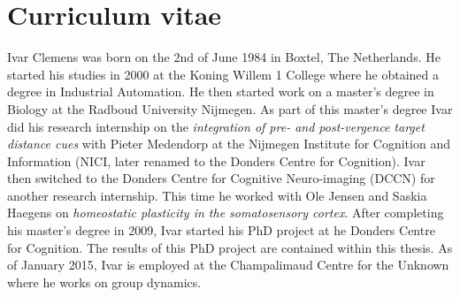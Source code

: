 \clearpage

\chapter*{Curriculum vitae}
{}

Ivar Clemens was born on the 2nd of June 1984 in Boxtel, The Netherlands. He started his studies in 2000 at the Koning Willem 1 College where he obtained a degree in Industrial Automation. He then started work on a master's degree in Biology at the Radboud University Nijmegen. As part of this master's degree Ivar did his research internship on the \emph{integration of pre- and post-vergence target distance cues} with Pieter Medendorp at the Nijmegen Institute for Cognition and Information (NICI, later renamed to the Donders Centre for Cognition). Ivar then switched to the Donders Centre for Cognitive Neuro-imaging (DCCN) for another research internship. This time he worked with Ole Jensen and Saskia Haegens on \emph{homeostatic plasticity in the somatosensory cortex}. After completing his master's degree in 2009, Ivar started his PhD project at he Donders Centre for Cognition. The results of this PhD project are contained within this thesis. As of January 2015, Ivar is employed at the Champalimaud Centre for the Unknown where he works on group dynamics.
